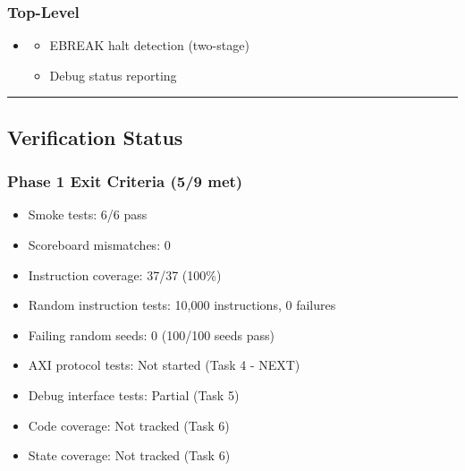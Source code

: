 \subsubsection{Top-Level}\label{cr:fix:fixes-index:top-level}

\begin{record}

\begin{itemize}
\tightlist
\item

  \begin{itemize}
  \tightlist
  \item
    EBREAK halt detection (two-stage)
  \item
    Debug status reporting
  \end{itemize}
\end{itemize}

\begin{center}\rule{0.5\linewidth}{0.5pt}\end{center}

\end{record}

\subsection{Verification Status}\label{cr:fix:fixes-index:verification-status}

\subsubsection{Phase 1 Exit Criteria (5/9 met)}\label{cr:fix:fixes-index:phase-1-exit-criteria-59-met}

\begin{record}

\begin{itemize}
\tightlist
\item
  \ok{} Smoke tests: 6/6 pass
\item
  \ok{} Scoreboard mismatches: 0
\item
  \ok{} Instruction coverage: 37/37 (100\%)
\item
  \ok{} Random instruction tests: 10,000 instructions, 0 failures
\item
  \ok{} Failing random seeds: 0 (100/100 seeds pass)
\item
  \bad{} AXI protocol tests: Not started (Task 4 - NEXT)
\item
  \warn{} Debug interface tests: Partial (Task 5)
\item
  \bad{} Code coverage: Not tracked (Task 6)
\item
  \bad{} State coverage: Not tracked (Task 6)
\end{itemize}

\end{record}

